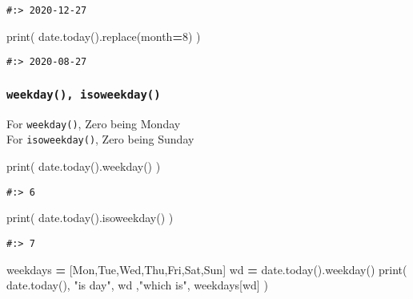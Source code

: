 \documentclass[
]{book}
\newenvironment{Shaded}{\begin{snugshade}}{\end{snugshade}}
\newcommand{\BuiltInTok}[1]{#1}
\newcommand{\DecValTok}[1]{\textcolor[rgb]{0.06,0.06,0.06}{#1}}
\newcommand{\NormalTok}[1]{#1}
\newcommand{\OperatorTok}[1]{\textcolor[rgb]{0.43,0.43,0.43}{\textbf{#1}}}
\newcommand{\StringTok}[1]{\textcolor[rgb]{0.5,0.5,0.5}{#1}}
\begin{document}
\begin{verbatim}
#:> 2020-12-27
\end{verbatim}

\begin{Shaded}
\begin{Highlighting}[]
\BuiltInTok{print}\NormalTok{( date.today().replace(month}\OperatorTok{=}\DecValTok{8}\NormalTok{) )}
\end{Highlighting}
\end{Shaded}

\begin{verbatim}
#:> 2020-08-27
\end{verbatim}

\hypertarget{weekday-isoweekday}{%
\subsubsection{\texorpdfstring{\texttt{weekday(),\ isoweekday()}}{weekday(), isoweekday()}}\label{weekday-isoweekday}}

For \texttt{weekday()}, Zero being Monday\\
For \texttt{isoweekday()}, Zero being Sunday

\begin{Shaded}
\begin{Highlighting}[]
\BuiltInTok{print}\NormalTok{( date.today().weekday() )}
\end{Highlighting}
\end{Shaded}

\begin{verbatim}
#:> 6
\end{verbatim}

\begin{Shaded}
\begin{Highlighting}[]
\BuiltInTok{print}\NormalTok{( date.today().isoweekday() )}
\end{Highlighting}
\end{Shaded}

\begin{verbatim}
#:> 7
\end{verbatim}

\begin{Shaded}
\begin{Highlighting}[]
\NormalTok{weekdays }\OperatorTok{=}\NormalTok{ [}\StringTok{\textquotesingle{}Mon\textquotesingle{}}\NormalTok{,}\StringTok{\textquotesingle{}Tue\textquotesingle{}}\NormalTok{,}\StringTok{\textquotesingle{}Wed\textquotesingle{}}\NormalTok{,}\StringTok{\textquotesingle{}Thu\textquotesingle{}}\NormalTok{,}\StringTok{\textquotesingle{}Fri\textquotesingle{}}\NormalTok{,}\StringTok{\textquotesingle{}Sat\textquotesingle{}}\NormalTok{,}\StringTok{\textquotesingle{}Sun\textquotesingle{}}\NormalTok{]}
\NormalTok{wd }\OperatorTok{=}\NormalTok{ date.today().weekday()}
\BuiltInTok{print}\NormalTok{( date.today(), }\StringTok{"is day"}\NormalTok{, wd ,}\StringTok{"which is"}\NormalTok{, weekdays[wd] )}
\end{Highlighting}
\end{Shaded}
\end{document}
